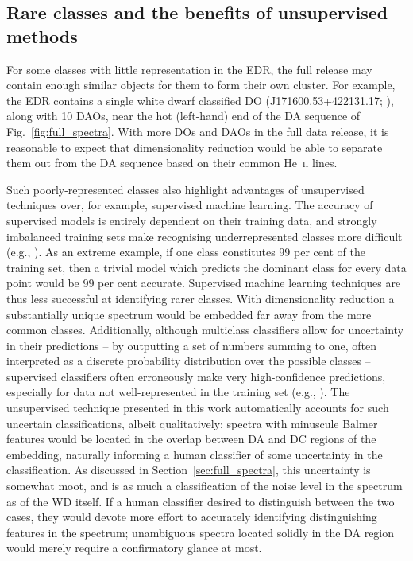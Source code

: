\documentclass[fleqn,usenatbib]{mnras}
\begin{document}
\subsection{Rare classes and the benefits of unsupervised methods}
\label{sec:rare}

For some classes with little representation in the EDR, the full release may contain enough similar objects for them to form their own cluster.
For example, the EDR contains a single white dwarf classified DO (J171600.53+422131.17; \citealt{manser24}), along with 10 DAOs, near the hot (left-hand) end of the DA sequence of Fig.~\ref{fig:full_spectra}.
With more DOs and DAOs in the full data release, it is reasonable to expect that dimensionality reduction would be able to separate them out from the DA sequence based on their common He~\textsc{ii} lines.

Such poorly-represented classes also highlight advantages of unsupervised techniques over, for example, supervised machine learning.
The accuracy of supervised models is entirely dependent on their training data, and strongly imbalanced training sets make recognising underrepresented classes more difficult (e.g., \citealt{he09, johnson19, das23}).
As an extreme example, if one class constitutes 99 per cent of the training set, then a trivial model which predicts the dominant class for every data point would be 99 per cent accurate.
Supervised machine learning techniques are thus less successful at identifying rarer classes.
With dimensionality reduction a substantially unique spectrum would be embedded far away from the more common classes.
Additionally, although multiclass classifiers allow for uncertainty in their predictions -- by outputting a set of numbers summing to one, often interpreted as a discrete probability distribution over the possible classes -- supervised classifiers often erroneously make very high-confidence predictions, especially for data not well-represented in the training set (e.g., \citealt{nguyen15, guo17, hein19}).
The unsupervised technique presented in this work automatically accounts for such uncertain classifications, albeit qualitatively: spectra with minuscule Balmer features would be located in the overlap between DA and DC regions of the embedding, naturally informing a human classifier of some uncertainty in the classification.
As discussed in Section~\ref{sec:full_spectra}, this uncertainty is somewhat moot, and is as much a classification of the noise level in the spectrum as of the WD itself.
If a human classifier desired to distinguish between the two cases, they would devote more effort to accurately identifying distinguishing features in the spectrum; unambiguous spectra located solidly in the DA region would merely require a confirmatory glance at most.
\end{document}

